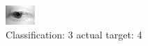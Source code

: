 \begin{figure}[h!]
\begin{center}
\includegraphics[width=0.60\columnwidth]{figures/ID2618_class_3_target_4.png}
\end{center}
\caption{ Classification: 3 actual target: 4}
\label{fig:ID2618_class_3_target_4}
\end{figure}
